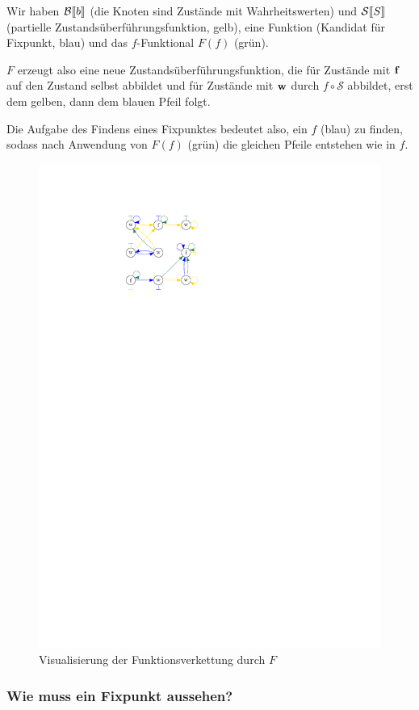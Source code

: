 Wir haben $\mathcal{B}\mathrm{[}\kern-.14em\mathrm{[} b\mathrm{]}\kern-.14em\mathrm{]}$ (die Knoten sind Zustände mit Wahrheitswerten) und $\mathcal{S}\mathrm{[}\kern-.14em\mathrm{[} S\mathrm{]}\kern-.14em\mathrm{]}$ (partielle Zustandsüberführungsfunktion, gelb), eine Funktion (Kandidat für Fixpunkt, blau) und das $f$-Funktional $F(f)$ (grün).

$F$ erzeugt also eine neue Zustandsüberführungsfunktion, die für Zustände mit $\operatorname{\mathbf{f}}$ auf den Zustand selbst abbildet und für Zustände mit $\operatorname{\mathbf{w}}$ durch $f \circ \mathcal{S}$ abbildet, \dh{} erst dem gelben, dann dem blauen Pfeil folgt.

Die Aufgabe des Findens eines Fixpunktes bedeutet also, ein $f$ (blau) zu finden, sodass nach Anwendung von $F(f)$ (grün) die gleichen Pfeile entstehen wie in $f$.
\begin{figure}[H]
    \centering
    \includegraphics[page=1,width=.4\textwidth]{img/f-combined}
    \caption{Visualisierung der Funktionsverkettung durch $F$}
\end{figure}



\subsubsection{Wie muss ein Fixpunkt aussehen?}

